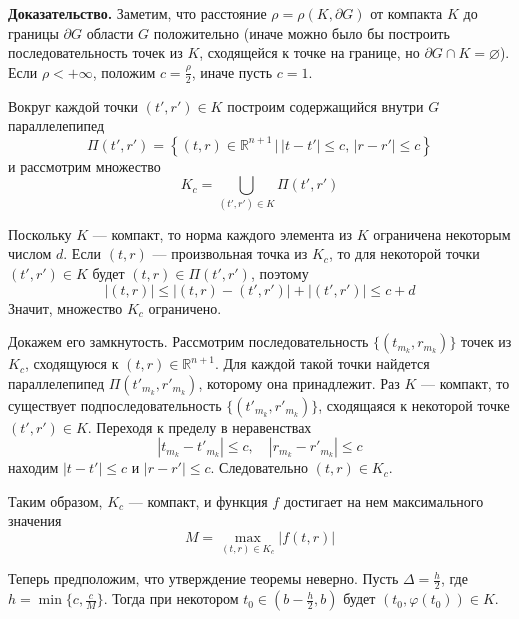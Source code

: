 \documentclass{article}
\begin{document}
\noindent \textbf{Доказательство.} Заметим, что расстояние $\rho = \rho(K, \partial G)$ от компакта $K$ до границы $\partial G$ области $G$ положительно (иначе можно было бы построить последовательность точек из $K$, сходящейся к точке на границе, но $\partial G \cap K = \varnothing$). Если $\rho < +\infty$, положим $c = \frac{\rho}{2}$, иначе пусть $c = 1$.

Вокруг каждой точки $(t', r') \in K$ построим содержащийся внутри $G$ параллелепипед
\begin{equation*}
    \Pi(t',r') = \left\{(t,r) \in \mathbb{R}^{n+1}\, | \, |t-t'| \le c,\, |r - r'| \le c \right\}
\end{equation*}
и рассмотрим множество
\begin{equation*}
    K_c = \bigcup_{(t',r') \in K} \Pi(t',r')
\end{equation*}

Поскольку $K$ --- компакт, то норма каждого элемента из $K$ ограничена некоторым числом $d$. Если $(t,r)$ --- произвольная точка из $K_c$, то для некоторой точки $(t',r') \in K$ будет $(t,r) \in \Pi(t',r')$, поэтому
\begin{equation*}
    |(t,r)| \le |(t,r) - (t',r')| + |(t',r')| \le c + d
\end{equation*}
Значит, множество $K_c$ ограничено.

Докажем его замкнутость. Рассмотрим последовательность $\{(t_{m_k}, r_{m_k})\}$ точек из $K_c$, сходящуюся к $(t,r) \in \mathbb{R}^{n+1}$. Для каждой такой точки найдется параллелепипед $\Pi(t'_{m_k},r'_{m_k})$, которому она принадлежит. Раз $K$ --- компакт, то существует подпоследовательность $\{(t'_{m_k}, r'_{m_k})\}$, сходящаяся к некоторой точке $(t',r') \in K$. Переходя к пределу в неравенствах
\begin{equation*}
    |t_{m_k} - t'_{m_k}| \le c, \quad |r_{m_k} - r'_{m_k}| \le c
\end{equation*}
находим $|t - t'| \le c$ и $|r - r'| \le c$. Следовательно $(t,r) \in K_c$.

Таким образом, $K_c$ --- компакт, и функция $f$ достигает на нем максимального значения
\begin{equation*}
    M = \max_{(t,r) \in K_c} |f(t,r)|
\end{equation*}

Теперь предположим, что утверждение теоремы неверно. Пусть $\Delta = \frac{h}{2}$, где $h = \min \{c, \frac{c}{M}\}$. Тогда при некотором $t_0 \in (b - \frac{h}{2}, b)$ будет $(t_0, \varphi(t_0)) \in K$.
\end{document}
